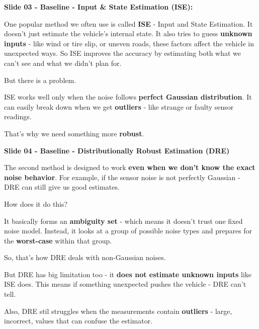 \documentclass[handout, aspectratio=169]{beamer}
\begin{document}
\begin{frame}
    \textbf{Slide 03 - Baseline - Input \& State Estimation (ISE):}
    
    One popular method we often use is called \textbf{ISE} - Input and State Estimation. It doesn't just estimate the vehicle's internal state. It also tries to guess \textbf{unknown inputs} - like wind or tire slip, or uneven roads, these factors affect the vehicle in unexpected ways. So ISE improves the accuracy by estimating both what we can't see and what we didn't plan for. 

    But there is a problem.

    ISE works well only when the noise follows \textbf{perfect Gaussian distribution}. It can easily break down when we get \textbf{outliers} - like strange or faulty sensor readings.

    That's why we need something more \textbf{robust}.
\end{frame}

\begin{frame}
    \textbf{Slide 04 - Baseline - Distributionally Robust Estimation (DRE)}

    The second method is designed to work \textbf{even when we don't know the exact noise behavior}. For example, if the sensor noise is not perfectly Gaussian - DRE can still give us good estimates.

    How does it do this?

    It basically forms an \textbf{ambiguity set} - which means it doesn't trust one fixed noise model. Instead, it looks at a group of possible noise types and prepares for the \textbf{worst-case} within that group.

    So, that's how DRE deals with non-Gaussian noises.

    But DRE has big limitation too - it \textbf{does not estimate unknown inputs} like ISE does. This means if something unexpected pushes the vehicle - DRE can't tell.

    Also, DRE stil struggles when the measurements contain \textbf{outliers} - large, incorrect, values that can confuse the estimator.
\end{frame}
\end{document}
